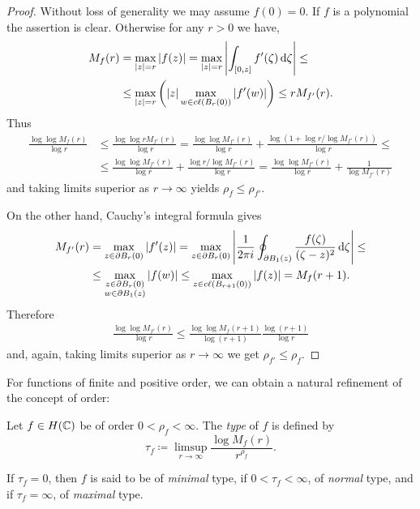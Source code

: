 \begin{proof}
    Without loss of generality we may assume $f(0) = 0$. If $f$ is a polynomial the assertion is clear. Otherwise for any $r > 0$ we have,
    \begin{align*}
        M_f(r) &= \max_{\vert z \vert = r} \vert f(z) \vert = \max_{\vert z \vert = r} \left\vert \int_{[0, z]} f'(\zeta) \mathop{}\!\mathrm{d} \zeta \right\vert \leq \\
        &\leq \max_{\vert z \vert = r} \left( \vert z \vert \max_{w \in c\ell({B_r(0)})} \vert f'(w) \vert \right) \leq r M_{f'}(r).
    \end{align*}
    Thus
    \begin{align*}
        \frac{\log \log M_f(r)}{\log r} &\leq \frac{\log \log r M_{f'}(r)}{\log r} = \frac{\log \log M_{f'}(r)}{\log r} + \frac{\log(1 + \log r / \log M_{f'}(r))}{\log r} \leq \\
        &\leq \frac{\log \log M_{f'}(r)}{\log r} + \frac{\log r / \log M_{f'}(r)}{\log r} = \frac{\log \log M_{f'}(r)}{\log r} + \frac{1}{\log M_{f'}(r)}
    \end{align*}
    and taking limits superior as $r \to \infty$ yields $\rho_f \leq \rho_{f'}$.

    On the other hand, Cauchy's integral formula gives
    \begin{align*}
        M_{f'}(r) &= \max_{z \in \partial B_r(0)} \vert f'(z) \vert = \max_{z \in \partial B_r(0)} \left\vert \frac{1}{2\pi i} \oint_{\partial B_1(z)} \frac{f(\zeta)}{(\zeta-z)^2} \mathop{}\!\mathrm{d} \zeta \right\vert \leq \\
        &\leq \max_{\substack{z \in \partial B_r(0) \\ w \in \partial B_1(z)}} \vert f(w) \vert \leq \max_{z \in c\ell({B_{r+1}(0)})} \vert f(z) \vert = M_f(r + 1).
    \end{align*}
    Therefore
    \begin{align*}
        \frac{\log \log M_{f'}(r)}{\log r} \leq \frac{\log \log M_f(r+1)}{\log (r+1)} \frac{\log (r+1)}{\log r}
    \end{align*}
    and, again, taking limits superior as $r \to \infty$ we get $\rho_{f'} \leq \rho_f$.
\end{proof}

For functions of finite and positive order, we can obtain a natural refinement of the concept of order:

\begin{definition}
    Let $f \in H(\mathbb{C})$ be of order $0 < \rho_f < \infty$. The \emph{type} of $f$ is defined by
    \begin{equation} \label{eq:def-type}
        \tau_f \coloneqq \limsup_{r \to \infty} \frac{\log M_f(r)}{r^{\rho_f}}.
    \end{equation}

    If $\tau_f = 0$, then $f$ is said to be of \emph{minimal} type, if $0 < \tau_f < \infty$, of \emph{normal} type, and if $\tau_f = \infty$, of \emph{maximal} type.
\end{definition}

